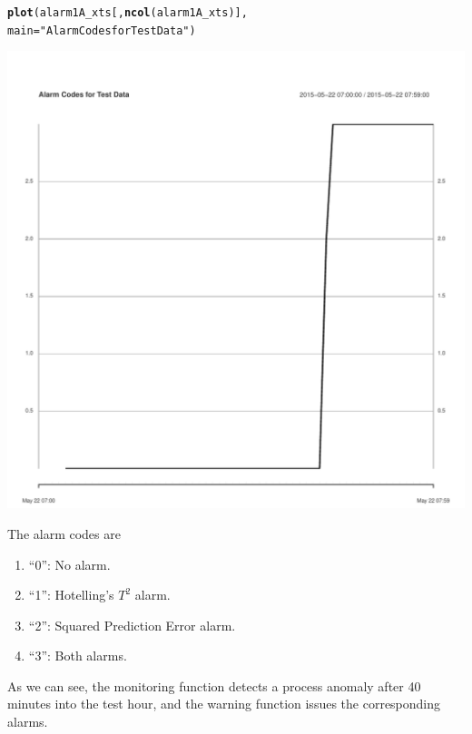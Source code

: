 \documentclass{report}\usepackage[]{graphicx}\usepackage[]{color}
\makeatletter
\def\maxwidth{ %
  \ifdim\Gin@nat@width>\linewidth
    \linewidth
  \else
    \Gin@nat@width
  \fi
}
\newcommand{\hlstr}[1]{\textcolor[rgb]{0.192,0.494,0.8}{#1}}%
\newcommand{\hlstd}[1]{\textcolor[rgb]{0.345,0.345,0.345}{#1}}%
\newcommand{\hlkwc}[1]{\textcolor[rgb]{0.333,0.667,0.333}{#1}}%
\newcommand{\hlkwd}[1]{\textcolor[rgb]{0.737,0.353,0.396}{\textbf{#1}}}%
\newenvironment{kframe}{%
 \def\at@end@of@kframe{}%
 \ifinner\ifhmode%
  \def\at@end@of@kframe{\end{minipage}}%
  \begin{minipage}{\columnwidth}%
 \fi\fi%
 \def\FrameCommand##1{\hskip\@totalleftmargin \hskip-\fboxsep
 \colorbox{shadecolor}{##1}\hskip-\fboxsep
     \hskip-\linewidth \hskip-\@totalleftmargin \hskip\columnwidth}%
 \MakeFramed {\advance\hsize-\width
   \@totalleftmargin\z@ \linewidth\hsize
   \@setminipage}}%
 {\par\unskip\endMakeFramed%
 \at@end@of@kframe}
\newenvironment{knitrout}{}{} %
\makeatother
\begin{document}
\begin{knitrout}
\color{fgcolor}\begin{kframe}
\begin{alltt}
\hlkwd{plot}\hlstd{(alarm1A_xts[,} \hlkwd{ncol}\hlstd{(alarm1A_xts)],}
     \hlkwc{main} \hlstd{=} \hlstr{"Alarm Codes for Test Data"}\hlstd{)}
\end{alltt}
\end{kframe}
\includegraphics[width=\maxwidth]{figure/r_warning_Plot-1}

\end{knitrout}
The alarm codes are
\begin{enumerate}
\item ``0'': No alarm.
\item ``1'': Hotelling's $T^2$ alarm.
\item ``2'': Squared Prediction Error alarm.
\item ``3'': Both alarms.
\end{enumerate}
As we can see, the monitoring function detects a process anomaly after 40 minutes into the test hour, and the warning function issues the corresponding alarms.



\end{document}

